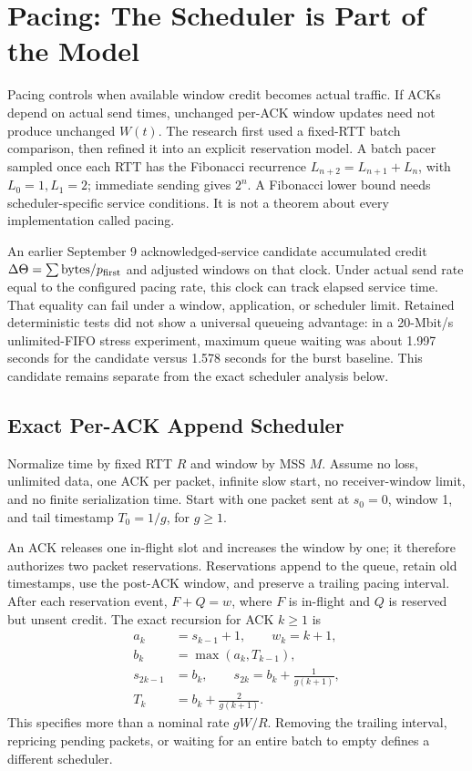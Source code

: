 \documentclass[conference,letterpaper]{IEEEtran}
\begin{document}
\section{Pacing: The Scheduler is Part of the Model}
Pacing controls when available window credit becomes actual traffic. If ACKs depend on actual send times, unchanged per-ACK window updates need not produce unchanged $W(t)$. The research first used a fixed-RTT batch comparison, then refined it into an explicit reservation model. A batch pacer sampled once each RTT has the Fibonacci recurrence $L_{n+2}=L_{n+1}+L_n$, with $L_0=1,L_1=2$; immediate sending gives $2^n$. A Fibonacci lower bound needs scheduler-specific service conditions. It is not a theorem about every implementation called pacing.

An earlier September 9 acknowledged-service candidate accumulated credit $\Delta\Theta=\sum\mathrm{bytes}/p_{\rm first}$ and adjusted windows on that clock. Under actual send rate equal to the configured pacing rate, this clock can track elapsed service time. That equality can fail under a window, application, or scheduler limit. Retained deterministic tests did not show a universal queueing advantage: in a 20-Mbit/s unlimited-FIFO stress experiment, maximum queue waiting was about 1.997 seconds for the candidate versus 1.578 seconds for the burst baseline. This candidate remains separate from the exact scheduler analysis below.

\subsection{Exact Per-ACK Append Scheduler}
Normalize time by fixed RTT $R$ and window by MSS $M$. Assume no loss, unlimited data, one ACK per packet, infinite slow start, no receiver-window limit, and no finite serialization time. Start with one packet sent at $s_0=0$, window 1, and tail timestamp $T_0=1/g$, for $g\ge1$.

An ACK releases one in-flight slot and increases the window by one; it therefore authorizes two packet reservations. Reservations append to the queue, retain old timestamps, use the post-ACK window, and preserve a trailing pacing interval. After each reservation event, $F+Q=w$, where $F$ is in-flight and $Q$ is reserved but unsent credit. The exact recursion for ACK $k\ge1$ is
\begin{align}
a_k&=s_{k-1}+1,\qquad w_k=k+1,\\
b_k&=\max(a_k,T_{k-1}),\\
s_{2k-1}&=b_k,\qquad s_{2k}=b_k+\frac1{g(k+1)},\\
T_k&=b_k+\frac2{g(k+1)}.\label{eq:rec}
\end{align}
This specifies more than a nominal rate $gW/R$. Removing the trailing interval, repricing pending packets, or waiting for an entire batch to empty defines a different scheduler.
\end{document}
